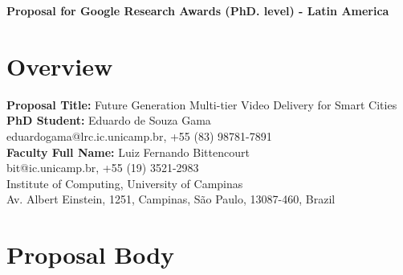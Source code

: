\documentclass[a4paper, 11pt]{article}
\begin{document}
	\begin{center}
		{\bf Proposal for Google Research Awards (PhD. level) - Latin America}
	\end{center}

	\section{Overview}

	\noindent
	{\bf Proposal Title:} Future Generation Multi-tier Video Delivery for Smart Cities\\
	{\bf PhD Student:} Eduardo de Souza Gama \\	
    eduardogama@lrc.ic.unicamp.br, +55 (83) 98781-7891 \\
	{\bf Faculty Full Name:} Luiz Fernando Bittencourt  \\
	bit@ic.unicamp.br, +55 (19) 3521-2983 \\
	Institute of Computing, University of Campinas \\
	Av. Albert Einstein, 1251, Campinas, São Paulo, 13087-460, Brazil \\

	\section{Proposal Body}	
	
	
	
    

    
    
    
    
    \begin{small}
        
        
    \end{small}
    
	
	
\end{document}
